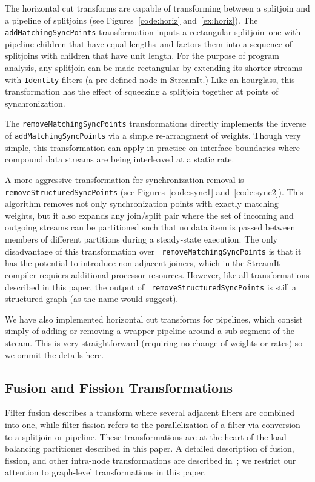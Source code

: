 The horizontal cut transforms are capable of transforming between a
splitjoin and a pipeline of splitjoins (see Figures~\ref{code:horiz}
and~\ref{ex:horiz}).  The {\tt addMatchingSyncPoints} transformation
inputs a rectangular splitjoin--one with pipeline children that have
equal lengths--and factors them into a sequence of splitjoins with
children that have unit length.  For the purpose of program analysis,
any splitjoin can be made rectangular by extending its shorter streams
with {\tt Identity} filters (a pre-defined node in StreamIt.)  Like an
hourglass, this transformation has the effect of squeezing a splitjoin
together at points of synchronization.

The {\tt removeMatchingSyncPoints} transformations directly implements
the inverse of {\tt addMatchingSyncPoints} via a simple re-arrangment
of weights.  Though very simple, this transformation can apply in
practice on interface boundaries where compound data streams are being
interleaved at a static rate.

A more aggressive transformation for synchronization removal is {\tt
removeStructuredSyncPoints} (see Figures~\ref{code:sync1}
and~\ref{code:sync2}).  This algorithm removes not only
synchronization points with exactly matching weights, but it also
expands any join/split pair where the set of incoming and outgoing
streams can be partitioned such that no data item is passed between
members of different partitions during a steady-state execution.  The
only disadvantage of this transformation over {\tt
removeMatchingSyncPoints} is that it has the potential to introduce
non-adjacent joiners, which in the StreamIt compiler requiers
additional processor resources.  However, like all transformations
described in this paper, the output of {\tt
removeStructuredSyncPoints} is still a structured graph (as the name
would suggest).

We have also implemented horizontal cut transforms for pipelines,
which consist simply of adding or removing a wrapper pipeline around a
sub-segment of the stream.  This is very straightforward (requiring no
change of weights or rates) so we ommit the details here.

\subsection{Fusion and Fission Transformations}

Filter fusion describes a transform where several adjacent filters are
combined into one, while filter fission refers to the parallelization
of a filter via conversion to a splitjoin or pipeline.  These
transformations are at the heart of the load balancing partitioner
described in this paper.  A detailed description of fusion, fission,
and other intra-node transformations are described
in~\cite{streamit-asplos}; we restrict our attention to graph-level
transformations in this paper.

